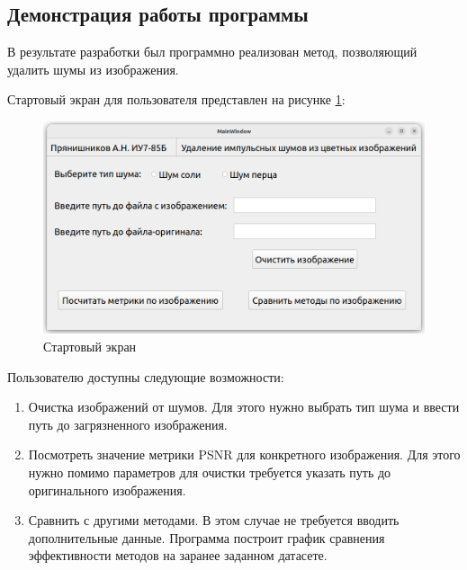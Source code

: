 \newpage
\subsection{Демонстрация работы программы}
В результате разработки был программно реализован метод, позволяющий удалить шумы из изображения.

Стартовый экран для пользователя представлен на рисунке \ref{tech::start}:
\FloatBarrier
\begin{figure}[h]	
	\begin{center}
		\includegraphics[width=\linewidth]{inc/png/startUI.png}
	\end{center}
	\captionsetup{justification=centering}
	\caption{Стартовый экран}
	\label{tech::start}
\end{figure}
\FloatBarrier

Пользователю доступны следующие возможности:
\begin{enumerate}
	\item Очистка изображений от шумов. Для этого нужно выбрать тип шума и ввести путь до загрязненного изображения.
	\item Посмотреть значение метрики PSNR для конкретного изображения. Для этого нужно помимо параметров для очистки требуется указать путь до оригинального изображения.
	\item Сравнить с другими методами. В этом случае не требуется вводить дополнительные данные. Программа построит график сравнения эффективности методов на заранее заданном датасете.
\end{enumerate}

